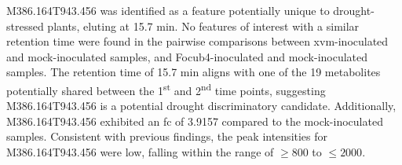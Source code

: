 M386.164T943.456 was identified as a feature potentially unique to drought-stressed plants, eluting at 15.7 min. No features of interest with a similar retention time were found in the pairwise comparisons between \ac{xvm}-inoculated and mock-inoculated samples, and \ac{Focub4}-inoculated and mock-inoculated samples. The retention time of 15.7 min aligns with one of the 19 metabolites potentially shared between the 1\textsuperscript{st} and 2\textsuperscript{nd} time points, suggesting M386.164T943.456 is a potential drought discriminatory candidate. Additionally, M386.164T943.456 exhibited an \ac{fc} of 3.9157 compared to the mock-inoculated samples. Consistent with previous findings, the peak intensities for M386.164T943.456 were low, falling within the range of $\geq800$ to $\leq2000$. 





